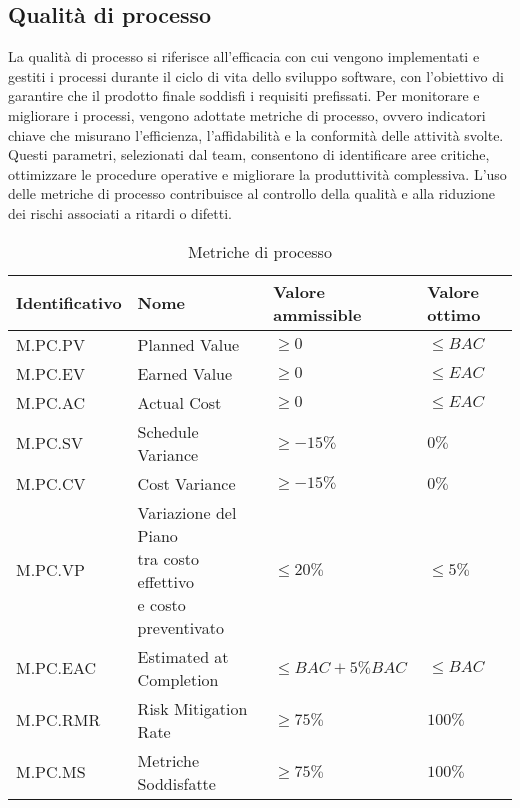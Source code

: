 \subsection{Qualità di processo}
\label{subsec:obiettivi_processo}
La qualità di processo si riferisce all'efficacia con cui vengono implementati e gestiti i processi durante il ciclo di vita dello sviluppo software, 
con l'obiettivo di garantire che il prodotto finale soddisfi i requisiti prefissati. 
Per monitorare e migliorare i processi, vengono adottate metriche di processo, ovvero indicatori chiave che misurano l'efficienza, l'affidabilità 
e la conformità delle attività svolte. 
Questi parametri, selezionati dal team, consentono di identificare aree critiche, ottimizzare le procedure operative e migliorare la produttività complessiva. 
L'uso delle metriche di processo contribuisce al controllo della qualità e alla riduzione dei rischi associati a ritardi o difetti.


\begin{table}[H]
    \centering
    \begin{tabular}{| l | l | l | l |}
    \hline
    \textbf{Identificativo} & 
    \textbf{Nome} &
    \textbf{Valore ammissible} &
    \textbf{Valore ottimo}\\
    \hline
        M.PC.PV & Planned Value & $\geq 0$ & $\leq BAC$ \\
    \hline
        M.PC.EV & Earned Value & $\geq 0$ & $\leq EAC$ \\
    \hline
        M.PC.AC & Actual Cost & $\geq 0$ & $\leq EAC$ \\
    \hline
        M.PC.SV & Schedule Variance & $\geq -15\%$ & $0\%$ \\
    \hline
        M.PC.CV & Cost Variance & $\geq -15\%$ & $0\%$ \\
    \hline  
        M.PC.VP & \makecell{Variazione del Piano \\ tra costo effettivo \\ e costo preventivato} & $\leq 20\%$ & $\leq 5\%$ \\
    \hline
        M.PC.EAC & Estimated at Completion & $\leq BAC+5\% BAC$ & $\leq BAC$ \\
    \hline
        M.PC.RMR & Risk Mitigation Rate & $\geq 75\%$ & $100\%$ \\
    \hline
        M.PC.MS & Metriche Soddisfatte & $\geq 75\%$ & $100\%$ \\
    \hline
    \end{tabular}
    \caption{Metriche di processo}
    \label{tab:metriche_processo} 
\end{table}